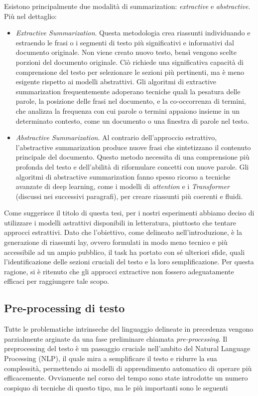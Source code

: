 \documentclass[12pt,a4paper,twoside,openright]{book}
\begin{document}
Esistono principalmente due modalità di summarization: \emph{extractive} e \emph{abstractive}.
Più nel dettaglio:
\begin{itemize}
\item \emph{Extractive Summarization}. Questa metodologia crea riassunti individuando e estraendo le frasi o i segmenti di testo più significativi e informativi dal documento originale. Non viene creato nuovo testo, bensì vengono scelte porzioni del documento originale. Ciò richiede una significativa capacità di comprensione del testo per selezionare le sezioni più pertinenti, ma è meno esigente rispetto ai modelli abstrattivi.
Gli algoritmi di extractive summarization frequentemente adoperano tecniche quali la pesatura delle parole, la posizione delle frasi nel documento, e la co-occorrenza di termini, che analizza la frequenza con cui parole o termini appaiono insieme in un determinato contesto, come un documento o una finestra di parole nel testo.
\item \emph{Abstractive Summarization}. Al contrario dell'approccio estrattivo, l'abstractive summarization produce nuove frasi che sintetizzano il contenuto principale del documento. Questo metodo necessita di una comprensione più profonda del testo e dell'abilità di riformulare concetti con nuove parole. Gli algoritmi di abstractive summarization fanno spesso ricorso a tecniche avanzate di deep learning, come i modelli di \emph{attention} e i \emph{Transformer} (discussi nei successivi paragrafi), per creare riassunti più coerenti e fluidi.
\end{itemize}

Come suggerisce il titolo di questa tesi, per i nostri esperimenti abbiamo deciso di utilizzare i modelli astrattivi disponibili in letteratura, piuttosto che tentare approcci estrattivi. 
Dato che l'obiettivo, come delineato nell'introduzione, è la generazione di riassunti lay, ovvero formulati in modo meno tecnico e più accessibile ad un ampio pubblico, il task ha portato con sé ulteriori sfide, quali l'identificazione delle sezioni cruciali del testo e la loro semplificazione. Per questa ragione, si è ritenuto che gli approcci extractive non fossero adeguatamente efficaci per raggiungere tale scopo.


\subsection{Pre-processing di testo} 
\label{preproc}
Tutte le problematiche intrinseche del linguaggio delineate in precedenza vengono parzialmente arginate da una fase preliminare chiamata \emph{pre-processing}. 
Il preprocessing del testo è un passaggio cruciale nell'ambito del Natural Language Processing (NLP), il quale mira a semplificare il testo e ridurre la sua complessità, permettendo ai modelli di apprendimento automatico di operare più efficacemente.
Ovviamente nel corso del tempo sono state introdotte un numero cospiquo di tecniche di questo tipo, ma le più importanti sono le seguenti
\end{document}
